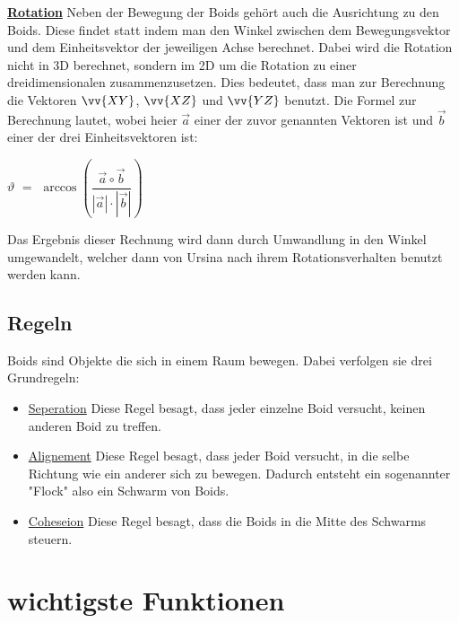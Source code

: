 \documentclass[a4paper, 12pt]{article}
\begin{document}
		\textbf{\underline{Rotation}} 
		Neben der Bewegung der Boids gehört auch die Ausrichtung zu den Boids. Diese findet statt indem man den Winkel zwischen dem Bewegungsvektor und dem Einheitsvektor der jeweiligen Achse berechnet. Dabei wird die Rotation nicht in 3D berechnet, sondern im 2D um die Rotation zu einer dreidimensionalen zusammenzusetzen. Dies bedeutet, dass man zur Berechnung die Vektoren $\vv{XY}$, $\vv{XZ}$ und $\vv{YZ}$ benutzt.
		Die Formel zur Berechnung lautet, wobei heier $\vec{a}$ einer der zuvor genannten Vektoren ist und $\vec{b}$ einer der drei Einheitsvektoren ist:
		
		\begin{center}
			$\vartheta$ $=$ $\arccos\left(\dfrac{\vec{a}\circ\vec{b}}{\left|\vec{a}\right|\cdot\left|\vec{b}\right|}\right)$
		\end{center}
	
		Das Ergebnis dieser Rechnung wird dann durch Umwandlung in den Winkel umgewandelt, welcher dann von Ursina nach ihrem Rotationsverhalten benutzt werden kann.
	\subsection{Regeln}
	Boids sind Objekte die sich in einem Raum bewegen. Dabei verfolgen sie drei Grundregeln:
	\begin{itemize}
		\item\underline{Seperation}\linebreak
		Diese Regel besagt, dass jeder einzelne Boid versucht, keinen anderen Boid zu treffen. 
		\item\underline{Alignement}\linebreak
		Diese Regel besagt, dass jeder Boid versucht, in die selbe Richtung wie ein anderer sich zu bewegen. Dadurch entsteht ein sogenannter "Flock" also ein Schwarm von Boids.
		\item\underline{Coheseion}\linebreak
		Diese Regel besagt, dass die Boids in die Mitte des Schwarms steuern.
	\end{itemize}
		
	\newpage
	\section{wichtigste Funktionen}
	\newpage
\end{document}
